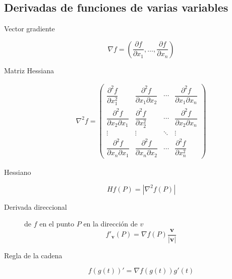 \begin{multicols}{2}
\subsection*{Derivadas de funciones de varias variables}

	\begin{tcolorbox}[hbox, title=Derivadas parciales]
		\begin{minipage}{0.4\textwidth}
			\flushleft
			\begin{description}
				\item[Vector gradiente]
				\[
          \nabla f = \left(\frac{\partial f}{\partial x_1},\ldots, \frac{\partial f}{\partial x_n}\right)
        \]
				\item[Matriz Hessiana]
				\[
          \begin{array}{c}
          \nabla^2f=
          \left(
          \begin{array}{cccc}
          \dfrac{\partial^2 f}{\partial x_1^2} & 
          \dfrac{\partial^2 f}{\partial x_1 \partial x_2} &
          \cdots &
          \dfrac{\partial^2 f}{\partial x_1 \partial x_n}\\
          \dfrac{\partial^2 f}{\partial x_2 \partial x_1} &
          \dfrac{\partial^2 f}{\partial x_2^2} & 
          \cdots &
          \dfrac{\partial^2 f}{\partial x_2 \partial x_n}\\
          \vdots & \vdots & \ddots & \vdots \\
          \dfrac{\partial^2 f}{\partial x_n \partial x_1} &
          \dfrac{\partial^2 f}{\partial x_n \partial x_2} &
          \cdots &
          \dfrac{\partial^2 f}{\partial x_n^2}
          \end{array}
          \right)
          \end{array}
        \]
				\item[Hessiano] 
				\[
				  Hf(P)=|\nabla^2f(P)|
				\]
				\item[Derivada direccional] de $f$ en el punto $P$ en la dirección de $v$
				\[
					f'_{\mathbf{v}}(P) = \nabla f(P)\frac{\mathbf{v}}{|\mathbf{v}|}
        \]
        \item[Regla de la cadena] 
        \[
          f(g(t))' = \nabla f(g(t))g'(t)
        \]
			\end{description}
		\end{minipage}
	\end{tcolorbox}


\end{multicols}
